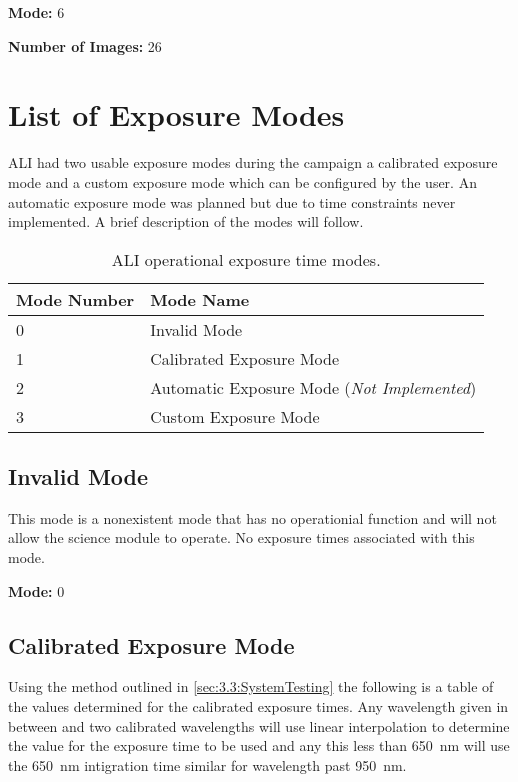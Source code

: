 \textbf{Mode:} 6

\textbf{Number of Images:} 26

\section{List of Exposure Modes}
\label{sec:B.3:ExposureModes} 

ALI had two usable exposure modes during the campaign a calibrated exposure mode and a custom exposure mode which can be configured by the user. An automatic exposure mode was planned but due to time constraints never implemented. A brief description of the modes will follow.

\begin{table}
    \begin{center}
    \begin{tabular}{|l|l|}
    \hline
    Mode Number & Mode Name \\
    \hline
    0 & Invalid Mode \\
    \hline
    1 & Calibrated Exposure Mode \\
    \hline
    2 & Automatic Exposure Mode (\textit{Not Implemented}) \\
    \hline
    3 & Custom Exposure Mode \\
    \hline
    \end{tabular}
    \end{center}
    \caption[ALI Operational Exposure Time Modes]{ALI operational exposure time modes.}
    \label{tab:B.3:ExposureModes}
\end{table}

\subsection{Invalid Mode}

This mode is a nonexistent mode that has no operationial function and will not allow the science module to operate. No exposure times associated with this mode.

\textbf{Mode:} 0

\subsection{Calibrated Exposure Mode}

Using the method outlined in \autoref{sec:3.3:SystemTesting} the following is a table of the values determined for the calibrated exposure times. Any wavelength given in between and two calibrated wavelengths will use linear interpolation to determine the value for the exposure time to be used and any this less than 650~nm will use the 650~nm intigration time similar for wavelength past 950~nm.

